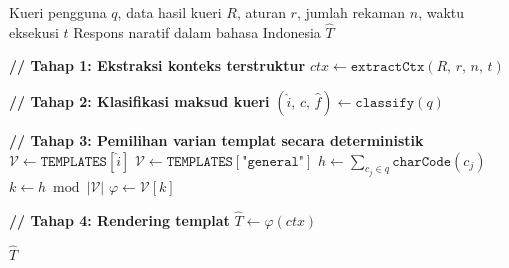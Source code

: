 \begin{algorithm}[htbp]
\caption{Pembangkitan Respons Berbasis Templat (\textit{Template-Based NLG})}
\label{alg:nlg-template}
\begin{algorithmic}[1]
\Require Kueri pengguna $q$, data hasil kueri $R$, aturan $r$, jumlah rekaman $n$, waktu eksekusi $t$
\Ensure Respons naratif dalam bahasa Indonesia $\hat{T}$

\State \textbf{// Tahap 1: Ekstraksi konteks terstruktur}
\State $\textit{ctx} \gets \texttt{extractCtx}(R,\, r,\, n,\, t)$

\State \textbf{// Tahap 2: Klasifikasi maksud kueri}
\State $(\hat{i},\, c,\, \hat{f}) \gets \texttt{classify}(q)$ 

\State \textbf{// Tahap 3: Pemilihan varian templat secara deterministik}
\State $\mathcal{V} \gets \texttt{TEMPLATES}[\hat{i}]$ 
    \State $\mathcal{V} \gets \texttt{TEMPLATES}[\texttt{"general"}]$
\EndIf
\State $h \gets \displaystyle\sum_{c_j \in q} \texttt{charCode}(c_j)$
\State $k \gets h \bmod |\mathcal{V}|$
\State $\varphi \gets \mathcal{V}[k]$

\State \textbf{// Tahap 4: Rendering templat}
\State $\hat{T} \gets \varphi(\textit{ctx})$

\State \Return $\hat{T}$

\end{algorithmic}
\end{algorithm}
